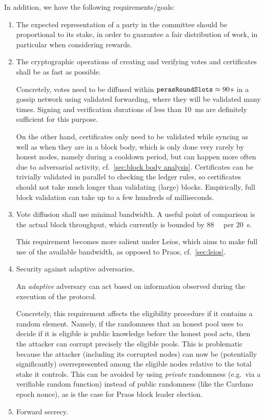In addition, we have the following requirements/goals:
\begin{enumerate}
\item\label{enumi:cert reqs fairness}
  The expected representation of a party in the committee should be proportional to its stake, in order to guarantee a fair distribution of work, in particular when considering rewards.
\item
  The cryptographic operations of creating and verifying votes and certificates shall be as fast as possible.

  Concretely, votes need to be diffused within $\perasRoundSlots \approx \qty{90}{\s}$ in a gossip network using validated forwarding, where they will be validated many times. Signing and verification durations of less than \qty{10}{\milli\s} are definitely sufficient for this purpose.

  On the other hand, certificates only need to be validated while syncing as well as when they are in a block body, which is only done very rarely by honest nodes, namely during a cooldown period, but can happen more often due to adversarial activity, cf.~\cref{sec:block body analysis}.
  Certificates can be trivially validated in parallel to checking the ledger rules, so certificates should not take much longer than validating (large) blocks.
  Empirically, full block validation can take up to a few hundreds of milliseconds.
\item
  Vote diffusion shall use minimal bandwidth.
  A useful point of comparison is the actual block throughput, which currently is bounded by \qty{88}{\kibi\byte} per \qty{20}{\s}.

  This requirement becomes more salient under Leios, which aims to make full use of the available bandwidth, as opposed to Praos, cf.~\cref{sec:leios}.
\item
  Security against adaptive adversaries.

  An \emph{adaptive} adversary can act based on information observed during the execution of the protocol.

  Concretely, this requirement affects the eligibility procedure if it contains a random element.
  Namely, if the randomness that an honest pool uses to decide if it is eligible is public knowledge before the honest pool acts, then the attacker can corrupt precisely the eligible pools.
  This is problematic because the attacker (including its corrupted nodes) can now be (potentially significantly) overrepresented among the eligible nodes relative to the total stake it controls.
  This can be avoided by using \emph{private} randomness (e.g.\ via a verifiable random function) instead of public randomness (like the Cardano epoch nonce), as is the case for Praos block leader election.
\item
  Forward secrecy.


\end{enumerate}
